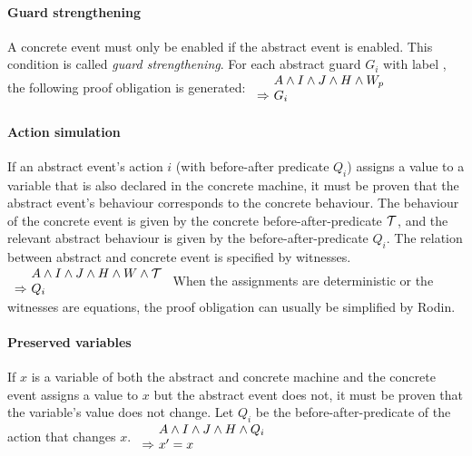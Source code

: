 \paragraph{Guard strengthening}
\label{guard_strengthening}
A concrete event must only be enabled if the abstract event is enabled.
This condition is called \emph{guard strengthening}.
For each abstract guard $G_i$ with label , the following
proof obligation is generated:
%
{}%
{$\begin{array}{r@{\ }l}
   & A \land I \land J \land H \land W_p \\
  \limp & G_i
  \end{array}$}

\paragraph{Action simulation}
\label{action_simulation}
If an abstract event's action $i$ (with before-after predicate $Q_i$)
  assigns a value to a variable that is also declared in the concrete machine,
  it must be proven that the abstract event's behaviour
  corresponds to the concrete behaviour.
The behaviour of the concrete event is given by the concrete before-after-predicate $\mathcal{T}$,
and the relevant abstract behaviour is given by the before-after-predicate $Q_i$.
The relation between abstract and concrete event is specified by witnesses.
%
  {}%
  {$\begin{array}{r@{\ }l}
      & A \land I \land J \land H \land W \land \concbeforeafter \\
      \limp & Q_i
    \end{array}$}
When the assignments are deterministic or the witnesses are equations, the proof obligation can usually
be simplified by Rodin.

\paragraph{Preserved variables}
\label{preserved_variables}
If $x$ is a variable of both the abstract and concrete machine and
  the concrete event assigns a value to $x$ but the abstract event does not,
  it must be proven that the variable's value does not change.
Let $Q_i$ be the before-after-predicate of the action that changes $x$.
%
  {}%
  {$\begin{array}{r@{\ }l}
      & A \land I \land J \land H \land Q_i \\
      \limp & x'=x
    \end{array}$}

